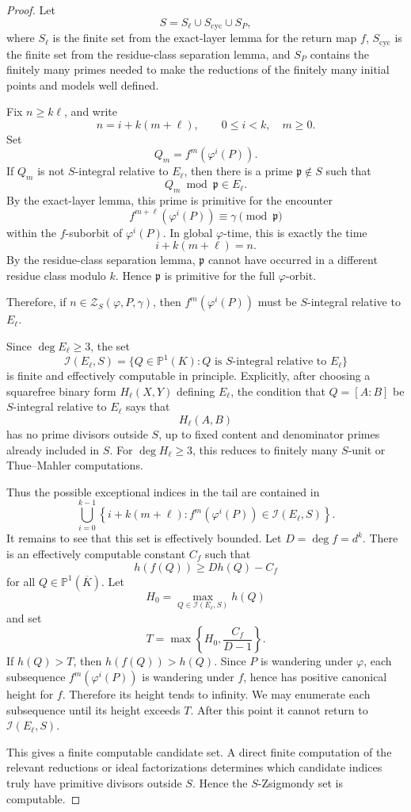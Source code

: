 \documentclass[11pt]{article}
\begin{document}
\begin{proof}
Let
\[
S=S_\ell\cup S_{\mathrm{cyc}}\cup S_P,
\]
where \(S_\ell\) is the finite set from the exact-layer lemma for the return map \(f\), \(S_{\mathrm{cyc}}\) is the finite set from the residue-class separation lemma, and \(S_P\) contains the finitely many primes needed to make the reductions of the finitely many initial points and models well defined.

Fix \(n\ge k\ell\), and write
\[
n=i+k(m+\ell),
\qquad
0\le i<k,\quad m\ge0.
\]
Set
\[
Q_m=f^m(\varphi^i(P)).
\]
If \(Q_m\) is not \(S\)-integral relative to \(E_\ell\), then there is a prime \(\mathfrak p\notin S\) such that
\[
Q_m\bmod\mathfrak p\in E_\ell.
\]
By the exact-layer lemma, this prime is primitive for the encounter
\[
f^{m+\ell}(\varphi^i(P))\equiv\gamma\pmod{\mathfrak p}
\]
within the \(f\)-suborbit of \(\varphi^i(P)\). In global \(\varphi\)-time, this is exactly the time
\[
i+k(m+\ell)=n.
\]
By the residue-class separation lemma, \(\mathfrak p\) cannot have occurred in a different residue class modulo \(k\). Hence \(\mathfrak p\) is primitive for the full \(\varphi\)-orbit.

Therefore, if \(n\in\mathcal Z_S(\varphi,P,\gamma)\), then \(f^m(\varphi^i(P))\) must be \(S\)-integral relative to \(E_\ell\).

Since \(\deg E_\ell\ge3\), the set
\[
\mathcal I(E_\ell,S)
=
\{Q\in\mathbb P^1(K):Q\text{ is }S\text{-integral relative to }E_\ell\}
\]
is finite and effectively computable in principle. Explicitly, after choosing a squarefree binary form \(H_\ell(X,Y)\) defining \(E_\ell\), the condition that \(Q=[A:B]\) be \(S\)-integral relative to \(E_\ell\) says that
\[
H_\ell(A,B)
\]
has no prime divisors outside \(S\), up to fixed content and denominator primes already included in \(S\). For \(\deg H_\ell\ge3\), this reduces to finitely many \(S\)-unit or Thue--Mahler computations.

Thus the possible exceptional indices in the tail are contained in
\[
\bigcup_{i=0}^{k-1}
\left\{
i+k(m+\ell):
f^m(\varphi^i(P))\in\mathcal I(E_\ell,S)
\right\}.
\]
It remains to see that this set is effectively bounded. Let \(D=\deg f=d^k\). There is an effectively computable constant \(C_f\) such that
\[
h(f(Q))\ge D h(Q)-C_f
\]
for all \(Q\in\mathbb P^1(\overline K)\). Let
\[
H_0=\max_{Q\in\mathcal I(E_\ell,S)}h(Q)
\]
and set
\[
T=\max\left\{H_0,\frac{C_f}{D-1}\right\}.
\]
If \(h(Q)>T\), then \(h(f(Q))>h(Q)\). Since \(P\) is wandering under \(\varphi\), each subsequence \(f^m(\varphi^i(P))\) is wandering under \(f\), hence has positive canonical height for \(f\). Therefore its height tends to infinity. We may enumerate each subsequence until its height exceeds \(T\). After this point it cannot return to \(\mathcal I(E_\ell,S)\).

This gives a finite computable candidate set. A direct finite computation of the relevant reductions or ideal factorizations determines which candidate indices truly have primitive divisors outside \(S\). Hence the \(S\)-Zsigmondy set is computable.
\end{proof}
\end{document}
